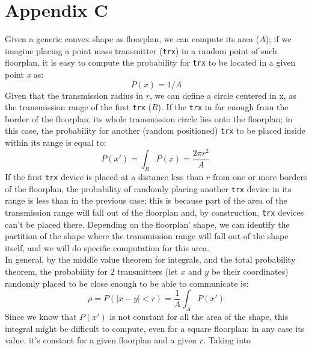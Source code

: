 \section{Appendix C}
\label{app:c}
Given a generic convex shape as floorplan, we can compute its area ($A$); if we
imagine placing a point mass transmitter (\texttt{trx}) in a random point of
such floorplan, it is easy to compute the probability for \texttt{trx} to be
located in a given point \textit{x} as:
\begin{equation*}
    P(x) = 1/A
\end{equation*}
Given that the transmission radius in $r$, we can define a circle centered in x, 
as the transmission range of the first \texttt{trx} ($R$). If the \texttt{trx}
in far enough from the border of the floorplan, its whole transmission circle lies
onto the floorplan; in this case, the probability for another (random
positioned) \texttt{trx} to be placed inside within its range is equal to:
\begin{equation*}
    P(x') = \int_{R}^{} P(x)= \frac{2\pi r^2}{A} \ 
\end{equation*}
If the first \texttt{trx} device is placed at a distance less than $r$ from one
or more borders of the floorplan, the probability of randomly placing another
\texttt{trx} device in its range is less than in the previous case; this is
because part of the area of the transmission range will fall out of the
floorplan and, by construction, \texttt{trx} devices can't be placed there. 
Depending on the floorplan' shape, we can identify the partition of the shape
where the transmission range will fall out of the shape itself, and we will do
specific computation for this area.\\
In general, by the middle value theorem for integrals, and the total probability
theorem, the probability for $2$ transmitters (let $x$ and $y$ be their
coordinates) randomly placed to be close enough to be able to communicate is:
\begin{equation*}
    \rho = P(|x-y|<r) = \frac{1}{A} \int_{A}^{} P(x')
\end{equation*}
Since we know that $P(x')$ is not constant for all the area of the shape, this
integral might be difficult to compute, even for a square floorplan; in any case
its value, it's constant for a given floorplan and a given $r$. Taking into
